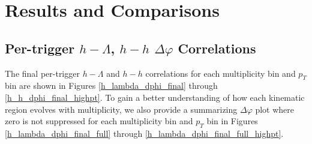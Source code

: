 \documentclass[ALICE,manyauthors]{ALICE_analysis_notes}
\begin{document}
\section{Results and Comparisons}
\label{results}
\subsection{Per-trigger $h-\Lambda$, $h-h$ $\Delta\varphi$ Correlations}
The final per-trigger $h-\Lambda$ and $h-h$ correlations for each multiplicity bin and $p_{T}$ bin are shown in Figures \ref{h_lambda_dphi_final} through \ref{h_h_dphi_final_highpt}. To gain a better understanding of how each kinematic region evolves with multiplicity, we also provide a summarizing $\Delta\varphi$ plot where zero is not suppressed for each multiplicity bin and $p_{T}$ bin in Figures \ref{h_lambda_dphi_final_full} through \ref{h_lambda_dphi_final_full_highpt}.

\clearpage
\end{document}
